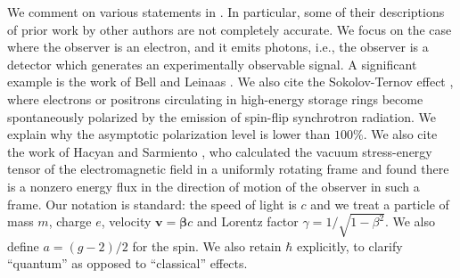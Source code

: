 \documentclass[review]{elsarticle}
\theoremstyle{plain}
\begin{document}
We comment on various statements in \cite{RUE}.
In particular, some of their descriptions of prior work by other authors \cite{BL1987,ST,JacksonRMP} are not completely accurate.
We focus on the case where the observer is an electron, and it emits photons,
i.e., the observer is a detector which generates an experimentally observable signal.
A significant example is the work of Bell and Leinaas \cite{BL1987,BL1983}.
We also cite the Sokolov-Ternov effect \cite{ST}, where electrons or positrons circulating in high-energy storage rings
become spontaneously polarized by the emission of spin-flip synchrotron radiation.
We explain why the asymptotic polarization level is lower than $100\%$.
We also cite the work of Hacyan and Sarmiento \cite{HS}, who calculated the vacuum stress-energy tensor of the electromagnetic field in a uniformly rotating frame
and found there is a nonzero energy flux in the direction of motion of the observer in such a frame.
Our notation is standard: the speed of light is $c$ and we treat a particle of mass $m$, charge $e$, velocity $\bm{v}=\bm{\beta}c$
and Lorentz factor $\gamma=1/\sqrt{1-\beta^2}$. We also define $a=(g-2)/2$ for the spin.
We also retain $\hbar$ explicitly, to clarify ``quantum'' as opposed to ``classical'' effects.

\setcounter{equation}{0}
\end{document}
